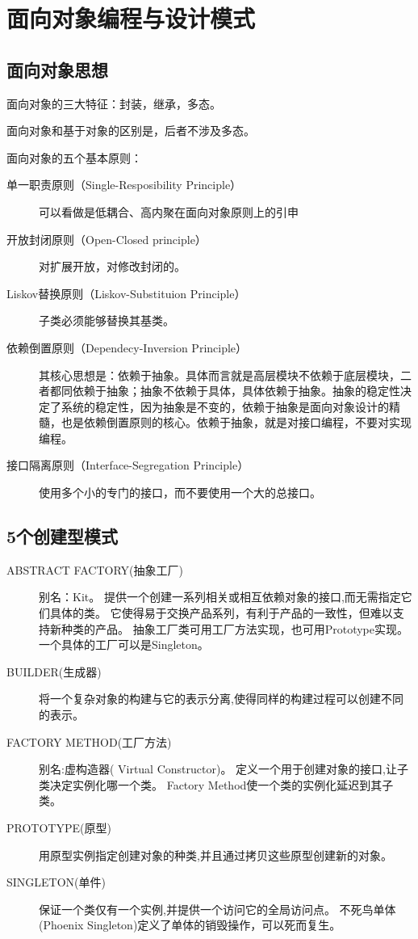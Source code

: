 \section{面向对象编程与设计模式}
\subsection{面向对象思想}
面向对象的三大特征：封装，继承，多态。

面向对象和基于对象的区别是，后者不涉及多态。

面向对象的五个基本原则：
\begin{description}
  \item [单一职责原则（Single-Resposibility Principle）]可以看做是低耦合、高内聚在面向对象原则上的引申
  \item [开放封闭原则（Open-Closed principle）]对扩展开放，对修改封闭的。
  \item [Liskov替换原则（Liskov-Substituion Principle）]子类必须能够替换其基类。
  \item [依赖倒置原则（Dependecy-Inversion Principle）] 其核心思想是：依赖于抽象。具体而言就是高层模块不依赖于底层模块，二者都同依赖于抽象；抽象不依赖于具体，具体依赖于抽象。抽象的稳定性决定了系统的稳定性，因为抽象是不变的，依赖于抽象是面向对象设计的精髓，也是依赖倒置原则的核心。依赖于抽象，就是对接口编程，不要对实现编程。
  \item [接口隔离原则（Interface-Segregation Principle）]使用多个小的专门的接口，而不要使用一个大的总接口。
\end{description}

\subsection{5个创建型模式}
\begin{description}
\item [ABSTRACT FACTORY(抽象工厂)]别名：Kit。
提供一个创建一系列相关或相互依赖对象的接口,而无需指定它们具体的类。
它使得易于交换产品系列，有利于产品的一致性，但难以支持新种类的产品。
抽象工厂类可用工厂方法实现，也可用Prototype实现。一个具体的工厂可以是Singleton。
\item [BUILDER(生成器)]
将一个复杂对象的构建与它的表示分离,使得同样的构建过程可以创建不同的表示。
\item [FACTORY METHOD(工厂方法)]别名:虚构造器( Virtual Constructor)。
定义一个用于创建对象的接口,让子类决定实例化哪一个类。 Factory Method使一个类的实例化延迟到其子类。
\item [PROTOTYPE(原型)]
用原型实例指定创建对象的种类,并且通过拷贝这些原型创建新的对象。
\item [SINGLETON(单件)]保证一个类仅有一个实例,并提供一个访问它的全局访问点。
不死鸟单体(Phoenix Singleton)定义了单体的销毁操作，可以死而复生。
\end{description}

